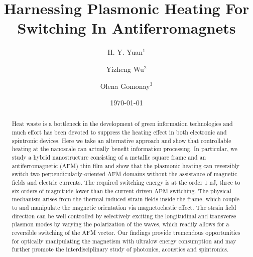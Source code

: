 \documentclass[aps,prl,reprint,floatfix,longbibliography,twocolumn]{revtex4-2}
\begin{document}
\title{Harnessing Plasmonic Heating For Switching In Antiferromagnets}
\author{H. Y. Yuan$^{1}$}
\author{Yizheng Wu$^{2}$}

\author{Olena Gomonay$^{3}$}


\date{\today}

\begin{abstract}
Heat waste is a bottleneck in the development of green information technologies and much effort has been devoted to suppress the heating effect in both electronic and spintronic devices. Here we take an alternative approach and show that controllable heating at the nanoscale can actually benefit information processing. In particular, we study a hybrid nanostructure consisting of a metallic square frame and an antiferromagnetic (AFM) thin film and show that the plasmonic heating can reversibly switch two perpendicularly-oriented AFM domains without the assistance of magnetic fields and electric currents. The required switching energy is at the order 1 nJ, three to six orders of magnitude lower than the current-driven AFM switching. The physical mechanism arises from the thermal-induced strain fields inside the frame, which couple to and manipulate the magnetic orientation via magnetoelastic effect. The strain field direction can be well controlled by selectively exciting the longitudinal and transverse plasmon modes by varying the polarization of the waves, which readily allows for a reversible switching of the AFM vector. Our findings provide tremendous opportunities for optically manipulating the magnetism with ultralow energy consumption and may further promote the interdisciplinary study of photonics, acoustics and spintronics.
\end{abstract}


\maketitle
\end{document}
